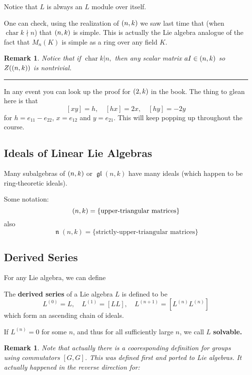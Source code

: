 \documentclass[12pt]{article}
\theoremstyle{nonumberbreak}
\theoremstyle{changebreak}
\theoremstyle{nonumberbreak}
\theoremstyle{change}
\newtheorem{rmk}[thm]{Remark}
\newcommand*{\brk}{
\rule{2in}{.1pt}
}
\DeclareMathOperator{\ch}{char}
\DeclareMathOperator{\gl}{\mathfrak{gl}}
\let\sl\relax
\DeclareMathOperator{\sl}{\mathfrak{sl}}
\let\t\relax
\DeclareMathOperator{\t}{\mathfrak{t}}
\DeclareMathOperator{\n}{\mathfrak{n}}
\begin{document}
Notice that $L$ is always an $L$ module over itself.

One can check, using the realization of $\sl(n,k)$ we saw last time that (when $\ch k\nmid n$)
that $\sl(n,k)$ is simple. This is actually the Lie algebra analogue of the fact that $M_n(K)$ is simple
as a ring over any field $K$.

\begin{rmk}
	Notice that if $\ch k |n$$,$ then \textit{any} scalar matrix $aI\in\sl(n,k)$
	so $Z(\sl(n,k))$ is nontrivial.
\end{rmk}

\brk

In any event you can look up the proof for $\sl(2,k)$ in the book. The thing to glean here is that
\[[xy]=h,\quad [hx]=2x,\quad [hy]=-2y\]
for $h=e_{11}-e_{22}$, $x=e_{12}$ and $y=e_{21}$. This will keep popping up throughout the course.

\subsection{Ideals of Linear Lie Algebras}
Many subalgebras of $\sl(n,k)$ or $\gl(n,k)$ have many ideals (which happen to be ring-theoretic ideals).

\begin{defn}
	Some notation:
	\[\t(n,k)=\{\text{upper-triangular matrices}\}\] 
	also 
	\[\n(n,k)=\{\text{strictly-upper-triangular matrices}\}\]
\end{defn}

\subsection{Derived Series}
For any Lie algebra, we can define
\begin{defn}
	The \textbf{derived series} of a Lie algebra $L$ is defined to be
	\[L^{(0)}=L,\quad L^{(1)}=[LL],\quad L^{(n+1)}=[L^{(n)}L^{(n)}]\]
	which form an ascending chain of ideals.
\end{defn}

\begin{defn}
	If $L^{(n)}=0$ for some $n$, and thus for all sufficiently large $n$, we call $L$ \textbf{solvable.}
\end{defn}
\begin{rmk}
	Note that actually there is a cooresponding definition for groups using commutators $[G,G]$.
	This was defined first and ported to Lie algebras. It actually happened in the reverse direction for:
\end{rmk}
\end{document}
